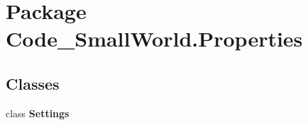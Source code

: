 \hypertarget{namespace_code___small_world_1_1_properties}{\section{Package Code\-\_\-\-Small\-World.\-Properties}
\label{namespace_code___small_world_1_1_properties}
}
\subsection*{Classes}
\begin{DoxyCompactItemize}
\item 
class {\bfseries Settings}
\end{DoxyCompactItemize}
